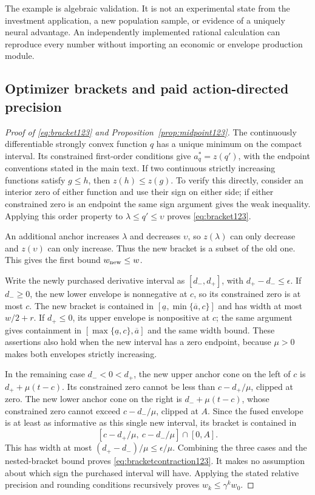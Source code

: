 The example is algebraic validation. It is not an experimental
state from the investment application, a new population sample,
or evidence of a uniquely neural advantage. An independently
implemented rational calculation can reproduce every number
without importing an economic or envelope production module.

\subsection{Optimizer brackets and paid action-directed precision}

\begin{proof}[Proof of \eqref{eq:bracket123} and Proposition~\ref{prop:midpoint123}]
The continuously differentiable strongly convex function $q$ has a
unique minimum on the compact interval. Its constrained first-order
conditions give $a_q^*=z(q')$, with the endpoint conventions stated
in the main text. If two continuous strictly increasing functions
satisfy $g\le h$, then $z(h)\le z(g)$. To verify this directly,
consider an interior zero of either function and use their sign
on either side; if either constrained zero is an endpoint the
same sign argument gives the weak inequality. Applying this
order property to $\lambda\le q'\le\upsilon$ proves
\eqref{eq:bracket123}.

An additional anchor increases $\lambda$ and decreases
$\upsilon$, so $z(\lambda)$ can only decrease and
$z(\upsilon)$ can only increase. Thus the new bracket is a
subset of the old one. This gives the first bound $w_{\rm new}\le w$.

Write the newly purchased derivative interval as $[d_-,d_+]$,
with $d_+-d_-\le\epsilon$. If $d_-\ge0$, the new lower
envelope is nonnegative at $c$, so its constrained zero is at most
$c$. The new bracket is contained in
$[\underline a,\min\{\overline a,c\}]$ and has width at most
$w/2+r$. If $d_+\le0$, its upper envelope is nonpositive at $c$;
the same argument gives containment in
$[\max\{\underline a,c\},\overline a]$ and the same width bound.
These assertions also hold when the new interval has a zero
endpoint, because $\mu>0$ makes both envelopes strictly increasing.

In the remaining case $d_-<0<d_+$, the new upper anchor cone
on the left of $c$ is $d_++\mu(t-c)$. Its constrained zero
cannot be less than $c-d_+/\mu$, clipped at zero. The new
lower anchor cone on the right is $d_-+\mu(t-c)$, whose
constrained zero cannot exceed $c-d_-/\mu$, clipped at $A$.
Since the fused envelope is at least as informative as this
single new interval, its bracket is contained in
\[
 [c-d_+/\mu,\ c-d_-/\mu]\cap[0,A].
\]
This has width at most $(d_+-d_-)/\mu\le\epsilon/\mu$.
Combining the three cases and the nested-bracket bound proves
\eqref{eq:bracketcontraction123}. It makes no assumption about
which sign the purchased interval will have. Applying the stated
relative precision and rounding conditions recursively proves
$w_k\le\gamma^k w_0$.


\end{proof}

